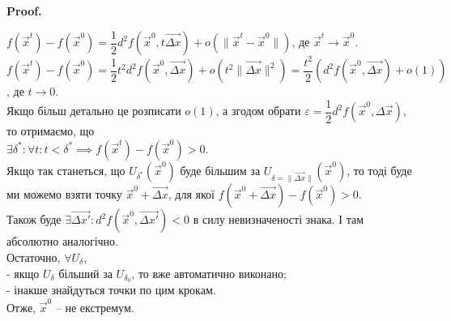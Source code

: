 \documentclass[a4paper, 10pt]{article}
\makeatletter
\theoremstyle{theoremdd}
\theoremstyle{theoremdd}
\theoremstyle{theoremdd}
\theoremstyle{theoremdd}
\theoremstyle{theoremdd}
\theoremstyle{theoremdd}
\theoremstyle{theoremdd}
\theoremstyle{theoremdd}
\theoremstyle{theoremdd}
\renewenvironment{proof}[1][Proof.\\]{\par
\pushQED{\hfill \qed}%
\normalfont \topsep6\p@\@plus6\p@\relax
\trivlist
\item\relax
{\bfseries
#1\@addpunct{.}}\hspace\labelsep\ignorespaces
}{%
\popQED\endtrivlist\@endpefalse
}
\newcommand\Norm[1]{\|#1\|}
\makeatother
\begin{document}
\begin{proof}
$f(\vec{x}^t) - f(\vec{x}^0) = \dfrac{1}{2} d^2f (\vec{x}^0, t \overrightarrow{\Delta x}) + o(\Norm{\vec{x}^t - \vec{x}^0})$, де $\vec{x}^t \to \vec{x}^0$.\\
$f(\vec{x}^t) - f(\vec{x}^0) = \dfrac{1}{2} t^2 d^2 f(\vec{x}^0, \overrightarrow{\Delta x}) + o(t^2 \Norm{\overrightarrow{\Delta x}}^2) = \dfrac{t^2}{2} \left(d^2 f(\vec{x}^0, \overrightarrow{\Delta x}) + o(1) \right)$, де $t \to 0$.\\
Якщо більш детально це розписати $o(1)$, а згодом обрати $\varepsilon = \dfrac{1}{2}d^2f(\vec{x}^0,\Delta \overrightarrow{x})$, то отримаємо, що\\
$\exists \delta^*: \forall t: t < \delta^* \implies f(\vec{x}^t) - f(\vec{x}^0) > 0$.\\
Якщо так станеться, що $U_{\delta^*}(\vec{x}^0)$ буде більшим за $U_{\delta = \Norm{\overrightarrow{\Delta x}}}(\vec{x}^0)$, то тоді буде ми можемо взяти точку $\vec{x}^0 + \overrightarrow{\Delta x}$, для якої $f(\vec{x}^0 + \overrightarrow{\Delta x}) - f(\vec{x}^0) > 0$.\\
Також буде $\exists \overrightarrow{\Delta x'}: d^2 f(\vec{x}^0, \overrightarrow{\Delta x'}) < 0$ в силу невизначеності знака. І там абсолютно аналогічно.\\
Остаточно, $\forall U_{\delta}$,\\
- якщо $U_{\delta}$ більший за $U_{\delta_0}$, то вже автоматично виконано;\\
- інакше знайдуться точки по цим крокам.\\
Отже, $\vec{x}^0$ -- не екстремум.
\end{proof}
\end{document}
